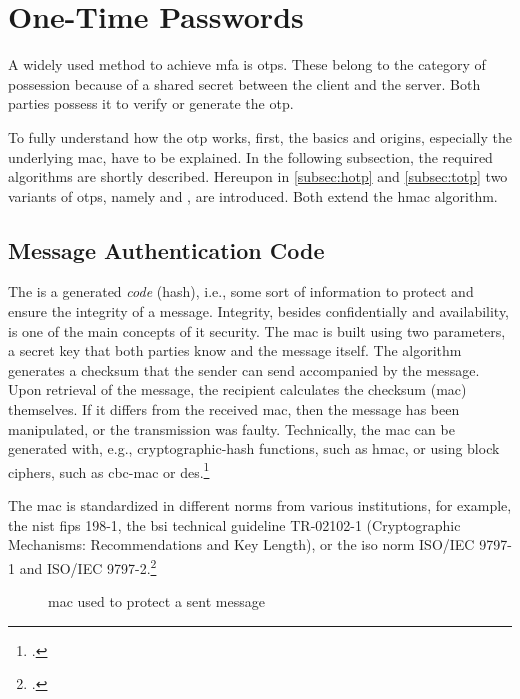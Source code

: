 \section{One-Time Passwords}

A widely used method to achieve \gls{mfa} is \glspl{otp}. These belong to the category of possession because of a shared secret between the client and the server. Both parties possess it to verify or generate the \gls{otp}.

To fully understand how the \gls{otp} works, first, the basics and origins, especially the underlying \gls{mac}, have to be explained. In the following subsection, the required algorithms are shortly described. Hereupon in \autoref{subsec:hotp} and \autoref{subsec:totp} two variants of \glspl{otp}, namely  and , are introduced. Both extend the \gls{hmac} algorithm.

\subsection{Message Authentication Code}

The  is a generated \textit{code} (hash), i.e., some sort of information to protect and ensure the integrity of a message. Integrity, besides confidentially and availability, is one of the main concepts of \gls{it} security. The \gls{mac} is built using two parameters, a secret key that both parties know and the message itself. The algorithm generates a checksum that the sender can send accompanied by the message. Upon retrieval of the message, the recipient calculates the checksum (\gls{mac}) themselves. If it differs from the received \gls{mac}, then the message has been manipulated, or the transmission was faulty. Technically, the \gls{mac} can be generated with, e.g., cryptographic-hash functions, such as \gls{hmac}, or using block ciphers, such as \gls{cbc-mac} or \gls{des}.\footcites[See][565]{doi:10.1002/9781118256107}[See][163--168]{anderson2008security}[See][391--393]{eckert-it-sec-9}

The \gls{mac} is standardized in different norms from various institutions, for example, the \gls{nist} \gls{fips} 198-1, the \gls{bsi} technical guideline TR-02102-1 (\frqq Cryptographic Mechanisms: Recommendations and Key Length\flqq{}), or the \gls{iso} norm ISO/IEC 9797-1 and ISO/IEC 9797-2.\footcites[See][]{FIPS198}[See][]{bsi2019recommendations}[See][]{iso9797-1}[See][]{iso9797-2}
 \\
\begin{figure}[hbt]
	\centering
	
	\caption[\Glsdesc{mac} used to protect a sent message]{\Glsdesc{mac} used to protect a sent message\footnotemark}
	\label{fig:mac}
\end{figure}

